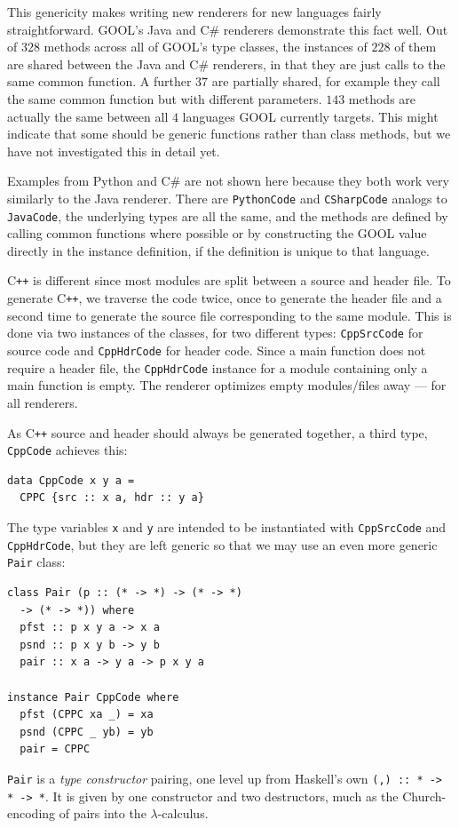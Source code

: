 \documentclass[sigplan,review,anonymous,prologue,dvipsnames]{acmart}
\newcommand{\Csharp}{C\#}
\newcommand{\Cplusplus}{C\texttt{++}}
\begin{document}
This genericity
makes writing new renderers for new languages fairly straightforward.
GOOL's Java and \Csharp{} renderers demonstrate this fact well. Out of $328$
methods across all of GOOL's type classes, the instances of $228$ of them are
shared between the Java and \Csharp{} renderers, in that they are just calls to the
same common function. A further $37$ are partially shared, for example they call
the same common function but with different parameters. $143$ methods are
actually the same between all $4$ languages GOOL currently targets. This might
indicate that some should be generic functions rather than class methods,
but we have not investigated this in detail yet.

Examples from Python and \Csharp{} are not shown here because they both
work very similarly to the Java renderer. There are \verb|PythonCode| and
\verb|CSharpCode| analogs to \verb|JavaCode|, the underlying types are all the
same, and the methods are defined by calling common functions where possible
or by constructing the GOOL value directly in the instance definition, if the
definition is unique to that language.

\Cplusplus{} is different since most modules are split between a source and
header file. To generate \Cplusplus, we traverse the code twice,
once to generate the header file and a second time to generate the
source file corresponding to the same module. This is done via two instances
of the classes, for two different types: \verb|CppSrcCode| for source code and
\verb|CppHdrCode| for header code. Since a main function does not require a
header file, the \verb|CppHdrCode| instance for a module containing only a main
function is empty. The renderer optimizes empty modules/files away --- for
all renderers.

As \Cplusplus{} source and header should always be generated together, a third
type, \verb|CppCode| achieves this:
\begin{lstlisting}
data CppCode x y a =
  CPPC {src :: x a, hdr :: y a}
\end{lstlisting}
The type variables \verb|x| and \verb|y| are intended to be instantiated with
\verb|CppSrcCode| and \verb|CppHdrCode|, but they are left generic
so that we may use an even more generic \verb|Pair| class:
\begin{lstlisting}
class Pair (p :: (* -> *) -> (* -> *)
  -> (* -> *)) where
  pfst :: p x y a -> x a
  psnd :: p x y b -> y b
  pair :: x a -> y a -> p x y a

instance Pair CppCode where
  pfst (CPPC xa _) = xa
  psnd (CPPC _ yb) = yb
  pair = CPPC
\end{lstlisting}
\verb|Pair| is a \emph{type constructor} pairing, one level up from
Haskell's own \verb|(,) :: * -> * -> *|.  It is given by one constructor
and two destructors, much as the Church-encoding of pairs into the
$\lambda$-calculus.
\end{document}
